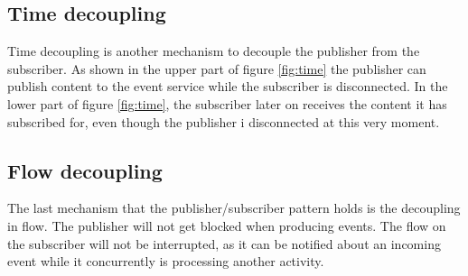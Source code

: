 \subsection{Time decoupling}
Time decoupling is another mechanism to decouple the publisher from the subscriber. As shown in the upper part of figure \ref{fig:time} the publisher can publish content to the event service while the subscriber is disconnected. In the lower part of figure \ref{fig:time}, the subscriber later on receives the content it has subscribed for, even though the publisher i disconnected at this very moment.

\subsection{Flow decoupling}
The last mechanism that the publisher/subscriber pattern holds is the decoupling in flow. The publisher will not get blocked when producing events. The flow on the subscriber will not be interrupted, as it can be notified about an incoming event while it concurrently is processing another activity.

